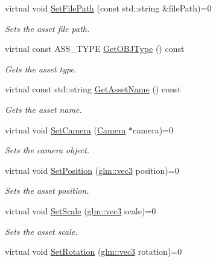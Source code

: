 \begin{CompactItemize}
virtual void \hyperlink{class_i_game_asset_60c6259d4630bc0dc1527c20e80bcc3e}{SetFilePath} (const std::string \&filePath)=0
\begin{CompactList}\small\item\em Sets the asset file path. \item\end{CompactList}\item 
virtual const ASS\_\-TYPE \hyperlink{class_i_game_asset_b21bb7eb1227a3cfa585428197cd1919}{GetOBJType} () const 
\begin{CompactList}\small\item\em Gets the asset type. \item\end{CompactList}\item 
virtual const std::string \hyperlink{class_i_game_asset_1ebad4f0cd4687fa4fe14aecf82edb9c}{GetAssetName} () const 
\begin{CompactList}\small\item\em Gets the asset name. \item\end{CompactList}\item 
virtual void \hyperlink{class_i_game_asset_152b3c23cfc77ba25c473f78e1987fc5}{SetCamera} (\hyperlink{class_camera}{Camera} $\ast$camera)=0
\begin{CompactList}\small\item\em Sets the camera object. \item\end{CompactList}\item 
virtual void \hyperlink{class_i_game_asset_2e98161443bb490819d97991f4dc662f}{SetPosition} (\hyperlink{group__core__types_g1c47e8b3386109bc992b6c48e91b0be7}{glm::vec3} position)=0
\begin{CompactList}\small\item\em Sets the asset position. \item\end{CompactList}\item 
virtual void \hyperlink{class_i_game_asset_bfda4878867c08bc8087c8fbe7336e54}{SetScale} (\hyperlink{group__core__types_g1c47e8b3386109bc992b6c48e91b0be7}{glm::vec3} scale)=0
\begin{CompactList}\small\item\em Sets the asset scale. \item\end{CompactList}\item 
virtual void \hyperlink{class_i_game_asset_46bb3a2356eb6b97bf7f5adfade662c3}{SetRotation} (\hyperlink{group__core__types_g1c47e8b3386109bc992b6c48e91b0be7}{glm::vec3} rotation)=0

\end{CompactItemize}
